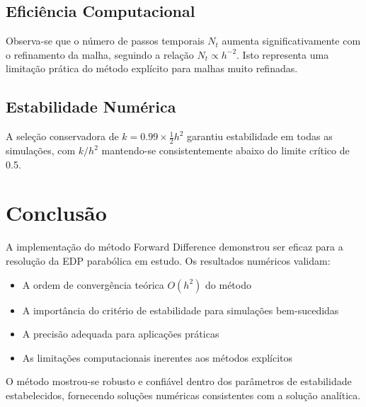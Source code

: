 \documentclass[10pt,twocolumn]{article}
\begin{document}
\subsection{Eficiência Computacional}

Observa-se que o número de passos temporais $N_t$ aumenta significativamente com o refinamento da malha, seguindo a relação $N_t \propto h^{-2}$. Isto representa uma limitação prática do método explícito para malhas muito refinadas.

\subsection{Estabilidade Numérica}

A seleção conservadora de $k = 0.99 \times \frac{1}{2}h^2$ garantiu estabilidade em todas as simulações, com $k/h^2$ mantendo-se consistentemente abaixo do limite crítico de 0.5.

\section{Conclusão}

A implementação do método Forward Difference demonstrou ser eficaz para a resolução da EDP parabólica em estudo. Os resultados numéricos validam:

\begin{itemize}
    \item A ordem de convergência teórica $O(h^2)$ do método
    \item A importância do critério de estabilidade para simulações bem-sucedidas
    \item A precisão adequada para aplicações práticas
    \item As limitações computacionais inerentes aos métodos explícitos
\end{itemize}

O método mostrou-se robusto e confiável dentro dos parâmetros de estabilidade estabelecidos, fornecendo soluções numéricas consistentes com a solução analítica.
\end{document}

